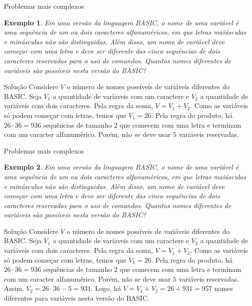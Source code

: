 \documentclass[aspectratio=169,t]{beamer}
\newtheorem{ex}{Exemplo}
\begin{document}
 \begin{frame}{Problemas mais complexos}
\footnotesize
  \begin{ex}
Em uma versão da linguagem BASIC, o nome de uma variável é uma sequência de um ou dois caracteres alfanuméricos, em que letras maiúsculas e minúsculas não são distinguidas. Além disso, um nome de variável deve começar com uma letra e deve ser diferente das cinco sequências de dois caracteres reservadas para o uso de comandos. Quantos nomes diferentes de variáveis são possíveis nesta versão do BASIC?
  \end{ex}

\begin{block}{Solução}
Considere $V$ o número de nomes possíveis de variáveis diferentes do BASIC. Seja $V_1$ a quantidade de varíaveis com um caractere e $V_2$ a quantidade de variáveis com dois caracteres. Pela regra da soma, $V=V_1+V_2$. Como as variáveis só podem começar com letras, temos que $V_1=26$. Pela regra do produto, há $26\cdot 36=936$ sequências de tamanho $2$ que comecem com uma letra e terminam com um caracter alfanumérico. Porém, não se deve usar $5$ variáveis reservadas.
  \end{block}

 \end{frame}
 
\verti
 \begin{frame}{Problemas mais complexos}
\footnotesize
  \begin{ex}
Em uma versão da linguagem BASIC, o nome de uma variável é uma sequência de um ou dois caracteres alfanuméricos, em que letras maiúsculas e minúsculas não são distinguidas. Além disso, um nome de variável deve começar com uma letra e deve ser diferente das cinco sequências de dois caracteres reservadas para o uso de comandos. Quantos nomes diferentes de variáveis são possíveis nesta versão do BASIC?
  \end{ex}

\begin{block}{Solução}
Considere $V$ o número de nomes possíveis de variáveis diferentes do BASIC. Seja $V_1$ a quantidade de varíaveis com um caractere e $V_2$ a quantidade de variáveis com dois caracteres. Pela regra da soma, $V=V_1+V_2$. Como as variáveis só podem começar com letras, temos que $V_1=26$. Pela regra do produto, há $26\cdot 36=936$ sequências de tamanho $2$ que comecem com uma letra e terminam com um caracter alfanumérico. Porém, não se deve usar $5$ variáveis reservadas. Assim, $V_2=26\cdot 36-5=931$. Logo, há $V=V_1+V_2 = 26+931=957$ nomes diferentes para variáveis nesta versão do BASIC.
  \end{block}

 \end{frame}
\end{document}
